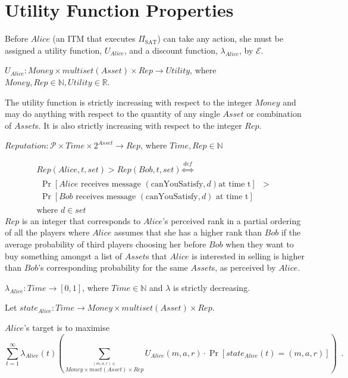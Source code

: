 \section{Utility Function Properties}
  Before $Alice$ (an ITM that executes $\Pi_{\mathrm{SAT}}$) can take any action, she must
  be assigned a utility function, $U_{Alice}$, and a discount function, $\lambda_{Alice}$,
  by $\mathcal{E}$.
  \begin{definition}
    $U_{Alice} : Money \times multiset\left(Asset\right) \times Rep \rightarrow
    Utility$, where $Money, Rep \in \mathbb{N}, Utility \in \mathbb{R}$.
  \end{definition}
  The utility function is strictly increasing with respect to the integer $Money$ and may
  do anything with respect to the quantity of any single $Asset$ or combination of
  $Asset$s. It is also strictly increasing with respect to the integer $Rep$.

  \begin{definition}
    $Reputation : \mathcal{P} \times Time \times 2^{Asset} \rightarrow Rep$, where $Time,
    Rep \in \mathbb{N}$
  \end{definition}
  \begin{gather*}
    Rep\left(Alice, t, set\right) > Rep\left(Bob, t, set\right) \overset{def}{\iff} \\
    \begin{aligned}
      \Pr\left[Alice \mbox{ receives message } \left(\mbox{canYouSatisfy}, d\right) \mbox{
      at time t}\right] &> \\
      \Pr\left[Bob \mbox{ receives message } \left(\mbox{canYouSatisfy}, d\right) \mbox{ at
      time t}\right] &
    \end{aligned} \\
    \mbox{where } d \in set
  \end{gather*}
  $Rep$ is an integer that corresponds to $Alice$'s perceived rank in a partial ordering
  of all the players where $Alice$ assumes that she has a higher rank than $Bob$ if the
  average probability of third players choosing her before $Bob$ when they want to buy
  something amongst a list of $Asset$s that $Alice$ is interested in selling is higher
  than $Bob$'s corresponding probability for the same $Asset$s, as perceived by $Alice$.

  \begin{definition}
    $\lambda_{Alice} : Time \rightarrow \left[0, 1\right]$, where $Time \in \mathbb{N}$
    and $\lambda$ is strictly decreasing.
  \end{definition}
  \begin{definition}[State]
  Let $state_{Alice} : Time \rightarrow Money \times multiset\left(Asset\right) \times
  Rep$.
  \end{definition}
  $Alice$'s target is to maximise
  \begin{equation*}
    \sum\limits_{t = 1}^{\infty}
    \lambda_{Alice}\left(t\right)\left(\sum\limits_{\overset{\left(m, a, r\right)
    \in}{Money \times mset\left(Asset\right) \times Rep}} U_{Alice}\left(m, a,
    r\right) \cdot \Pr\left[state_{Alice}\left(t\right) = \left(m, a,
    r\right)\right]\right) \enspace.
  \end{equation*}
